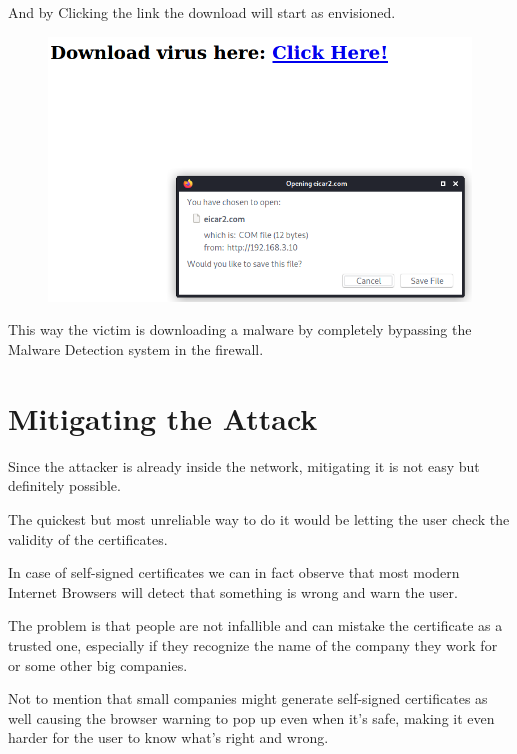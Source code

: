 And by Clicking the link the download will start as envisioned.

\begin{figure}[h!]
 \centering
 \includegraphics[width=13cm]{img/after_proxy.png}
\end{figure}

This way the victim is downloading a malware by completely bypassing the Malware Detection system in the firewall.


\newpage

\section{Mitigating the Attack}

Since the attacker is already inside the network, mitigating it is not easy but definitely possible.

The quickest but most unreliable way to do it would be letting the user check the validity of the certificates.

In case of self-signed certificates we can in fact observe that most modern Internet Browsers will detect that something is wrong and warn the user.

The problem is that people are not infallible and can mistake the certificate as a trusted one, especially if they recognize the name of the company they work for or some other big companies.

Not to mention that small companies might generate self-signed certificates as well causing the browser warning to pop up even when it's safe, making it even harder for the user to know what's right and wrong.

